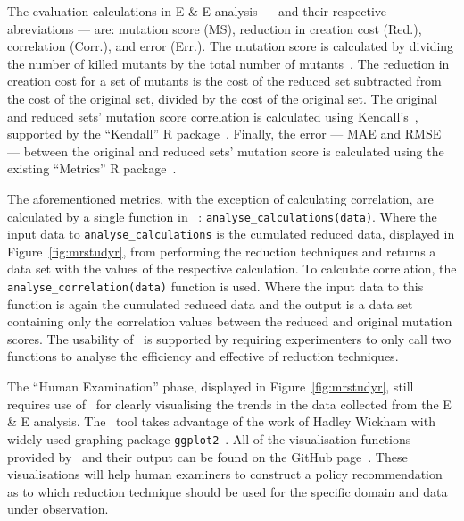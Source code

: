The evaluation calculations in E \& E analysis --- and their respective abreviations --- are: mutation score (MS), reduction in creation cost (Red.),
correlation (Corr.), and error (Err.). The mutation score is calculated by dividing the number of killed mutants by the total number
of mutants~\cite{wong1995reducing}. The reduction in creation cost for a set of mutants is the cost of the reduced set subtracted
from the cost of the original set, divided by the cost of the original set. The original and reduced sets' mutation score correlation is calculated using Kendall's~\taub, supported
by the ``Kendall'' R package~\cite{mcleod2015kendall}. Finally, the error --- MAE and RMSE --- between the original and reduced sets' mutation score
is calculated using the existing ``Metrics'' R package~\cite{metrics}.

The aforementioned metrics, with the exception of calculating correlation, are calculated by a single function in \mr~: \texttt{analyse\_calculations(data)}.
Where the input data to \texttt{analyse\_calculations} is the cumulated reduced data, displayed in Figure~\ref{fig:mrstudyr}, from performing
the reduction techniques and returns a data set with the values of the respective calculation. To calculate correlation,
the \texttt{analyse\_correlation(data)} function is used. Where the input data to this function is again the cumulated reduced data and
the output is a data set containing only the correlation values between the reduced and original mutation scores.
The usability of \mr~is supported by requiring experimenters to only call two functions to analyse the efficiency and effective of reduction techniques.


The ``Human Examination'' phase, displayed in Figure~\ref{fig:mrstudyr}, still requires use of \mr~for clearly visualising the trends
in the data collected from the E \& E analysis.
The \mr~tool takes advantage of the work of Hadley Wickham with widely-used
graphing package \texttt{ggplot2}~\cite{ggplot2}.
All of the visualisation functions provided by \mr~and their output can be found on the GitHub
page~\cite{tool}. These visualisations will help human examiners to construct a policy recommendation
as to which reduction technique should be used for the specific domain and data under observation.

